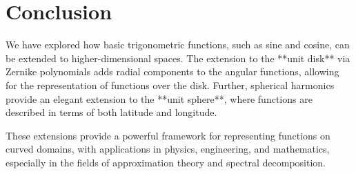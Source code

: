 \section{Conclusion}

We have explored how basic trigonometric functions, such as sine and cosine, can be extended to higher-dimensional spaces. The extension to the **unit disk** via Zernike polynomials adds radial components to the angular functions, allowing for the representation of functions over the disk. Further, spherical harmonics provide an elegant extension to the **unit sphere**, where functions are described in terms of both latitude and longitude.

These extensions provide a powerful framework for representing functions on curved domains, with applications in physics, engineering, and mathematics, especially in the fields of approximation theory and spectral decomposition.

\endinput  %
